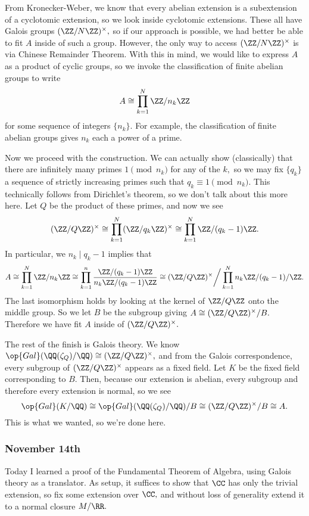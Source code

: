 From Kronecker-Weber, we know that every abelian extension is a subextension of a cyclotomic extension, so we look inside cyclotomic extensions. These all have Galois groups $(\ZZ/N\ZZ)^\times,$ so if our approach is possible, we had better be able to fit $A$ inside of such a group. However, the only way to access $(\ZZ/N\ZZ)^\times$ is via Chinese Remainder Theorem. With this in mind, we would like to express $A$ as a product of cyclic groups, so we invoke the classification of finite abelian groups to write
\[A\cong\prod_{k=1}^N\ZZ/n_k\ZZ\]
for some sequence of integers $\{n_k\}.$ For example, the classification of finite abelian groups gives $n_k$ each a power of a prime.

Now we proceed with the construction. We can actually show (classically) that there are infinitely many primes $1\pmod{n_k}$ for any of the $k,$ so we may fix $\{q_k\}$ a sequence of strictly increasing primes such that $q_k\equiv1\pmod{n_k}.$ This technically follows from Dirichlet's theorem, so we don't talk about this more here. Let $Q$ be the product of these primes, and now we see
\[(\ZZ/Q\ZZ)^\times\cong\prod_{k=1}^N(\ZZ/q_k\ZZ)^\times\cong\prod_{k=1}^N\ZZ/(q_k-1)\ZZ.\]
In particular, we $n_k\mid q_k-1$ implies that
\[A\cong\prod_{k=1}^N\ZZ/n_k\ZZ\cong\prod_{k=1}^n\frac{\ZZ/(q_k-1)\ZZ}{n_k\ZZ/(q_k-1)\ZZ}\cong(\ZZ/Q\ZZ)^\times\bigg/\prod_{k=1}^Nn_k\ZZ/(q_k-1)/\ZZ.\]
The last isomorphism holds by looking at the kernel of $\ZZ/Q\ZZ$ onto the middle group. So we let $B$ be the subgroup giving $A\cong(\ZZ/Q\ZZ)^\times/B.$ Therefore we have fit $A$ inside of $(\ZZ/Q\ZZ)^\times.$

The rest of the finish is Galois theory. We know $\op{Gal}(\QQ(\zeta_Q)/\QQ)\cong(\ZZ/Q\ZZ)^\times,$ and from the Galois correspondence, every subgroup of $(\ZZ/Q\ZZ)^\times$ appears as a fixed field. Let $K$ be the fixed field corresponding to $B.$ Then, because our extension is abelian, every subgroup and therefore every extension is normal, so we see
\[\op{Gal}(K/\QQ)\cong\op{Gal}(\QQ(\zeta_Q)/\QQ)/B\cong(\ZZ/Q\ZZ)^\times/B\cong A.\]
This is what we wanted, so we're done here.

\subsubsection{November 14th}
Today I learned a proof of the Fundamental Theorem of Algebra, using Galois theory as a translator. As setup, it suffices to show that $\CC$ has only the trivial extension, so fix some extension over $\CC,$ and without loss of generality extend it to a normal closure $M/\RR.$

